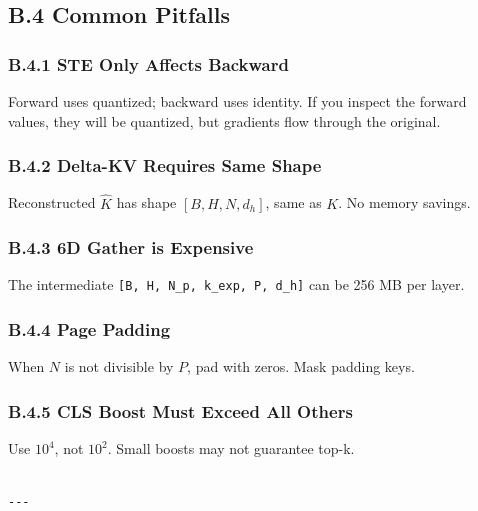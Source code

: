 \subsection{B.4 Common Pitfalls}

\subsubsection{B.4.1 STE Only Affects Backward}

Forward uses quantized; backward uses identity. If you inspect the forward 
values, they will be quantized, but gradients flow through the original.

\subsubsection{B.4.2 Delta-KV Requires Same Shape}

Reconstructed $\hat{K}$ has shape $[B, H, N, d_h]$, same as $K$. No memory 
savings.

\subsubsection{B.4.3 6D Gather is Expensive}

The intermediate \texttt{[B, H, N\_p, k\_exp, P, d\_h]} can be 256 MB per layer.

\subsubsection{B.4.4 Page Padding}

When $N$ is not divisible by $P$, pad with zeros. Mask padding keys.

\subsubsection{B.4.5 CLS Boost Must Exceed All Others}

Use $10^4$, not $10^2$. Small boosts may not guarantee top-k.
\begin{lstlisting}

---
\end{lstlisting}